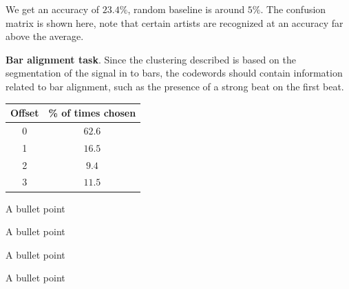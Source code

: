 \documentclass[portrait,a0b,final]{a0poster}
\newenvironment{poster}{
  \begin{center}
  \begin{minipage}[c]{0.98\textwidth}
}{
  \end{minipage} 
  \end{center}
}
\newcommand{\pbox}[4]{
\psshadowbox[#3]{
\begin{minipage}[t][#2][t]{#1}
#4
\end{minipage}
}}
\newcommand{\mytablecaption}[1]{
  \vspace{1.0cm}
  \begin{quote}
    {{\sc Table} \arabic{table}: #1}
  \end{quote}
  \vspace{1cm}
  \stepcounter{table}
}
\begin{document}
\begin{poster}
\begin{multicols}{3}
\begin{minipage}[c]{\columnwidth}
We get an accuracy of $\mathbf{23.4\%}$, random baseline 
is around $5\%$. 
The confusion matrix is shown here, note 
that certain artists are recognized at an accuracy far above the average.

\end{minipage}

\vspace{2cm}

\begin{minipage}[c][9cm][c]{\columnwidth}
\textbf{Bar alignment task}.
Since the clustering described is based
on the segmentation of the signal in to bars, 
the codewords should contain information related to bar
alignment, such as the presence of a strong beat on the first beat.\\
\end{minipage}
\begin{minipage}[c][9cm][c]{0.21\textwidth}
  \begin{center}
      \begin{tabular}{cc}
        Offset & \% of times chosen \\ \hline \hline
        0 & $\mathbf{62.6}$\\
        1 & $16.5$\\
        2 & $9.4$\\
        3 & $11.5$
      \end{tabular}
      \label{tab:offset}
  \end{center}
\end{minipage}

\begin{list}{}{\leftmargin=2em =1em}
\item A bullet point
\item A bullet point
\item A bullet point
\item A bullet point
\end{list}


\vspace{0cm}
\begin{center}
  \pbox{0.8\columnwidth}{}{linewidth=2mm,framearc=0.1,linecolor=lightred,fillstyle=gradient,gradangle=0,gradbegin=white,gradend=whitepink,gradmidpoint=1.0,framesep=1em}{
    \begin{center}
      \large Conclusion
    \end{center}}
\end{center}


\end{multicols}
\end{poster}
\end{document}
